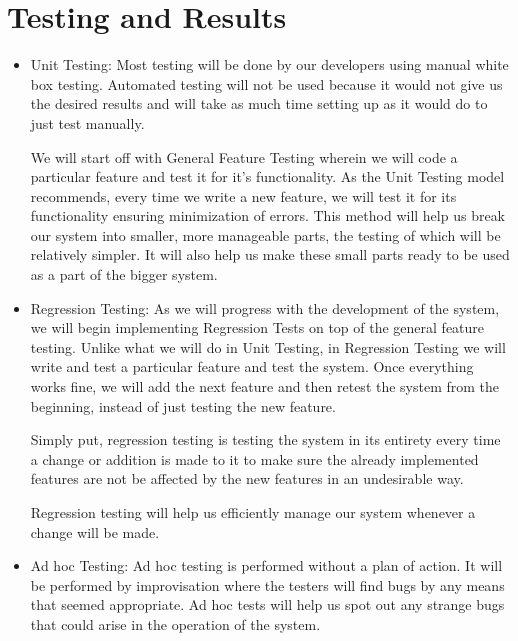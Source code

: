 \chapter{Testing and Results}
\begin{itemize}
\item
Unit Testing: Most testing will be done by our developers using manual white box testing. Automated testing will not be used because it would not give us the desired results and will take as much time setting up as it would do to just test manually.

	We will start off with General Feature Testing wherein we will code a particular feature and test it for it's functionality. As the Unit Testing model recommends, every time we write a new feature, we will test it for its functionality ensuring minimization of errors.
    This method will help us break our system into smaller, more manageable parts, the testing of which will be relatively simpler. It will also help us make these small parts ready to be used as a part of the bigger system.
\end{itemize}

\begin{itemize}
\item Regression Testing: As we will progress with the development of the system, we will begin implementing Regression Tests on top of the general feature testing. Unlike what we will do in Unit Testing, in Regression Testing we will write and test a particular feature and test the system. Once everything works fine, we will add the next feature and then retest the system from the beginning, instead of just testing the new feature.

Simply put, regression testing is testing the system in its entirety every time a change or addition is made to it to make sure the already implemented features are not be affected by the new features in an undesirable way.

Regression testing will help us efficiently manage our system whenever a change will be made.
\end{itemize}
\begin{itemize}
\item Ad hoc Testing: Ad hoc testing is performed without a plan of action. It will be performed by improvisation where the testers will find bugs by any means that seemed appropriate. Ad hoc tests will help us spot out any strange bugs that could arise in the operation of the system.
\end{itemize}
